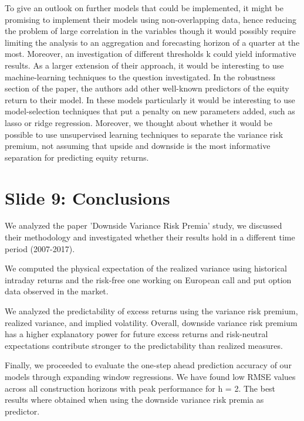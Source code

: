 \documentclass[12pt, letterpaper]{article}
\begin{document}
\vspace{3mm}
\noindent
To give an outlook on further models that could be implemented, it might be promising to implement their models using non-overlapping data, hence reducing the problem of large correlation in the variables though it would possibly require limiting the analysis to an aggregation and forecasting horizon of a quarter at the most. Moreover, an investigation of different thresholds k could yield informative results.
As a larger extension of their approach, it would be interesting to use machine-learning techniques to the question investigated. In the robustness section of the paper, the authors add other well-known predictors of the equity return to their model. In these models particularly it would be interesting to use model-selection techniques that put a penalty on new parameters added, such as lasso or ridge regression. Moreover, we thought about whether it would be possible to use unsupervised learning techniques to separate the variance risk premium, not assuming that upside and downside is the most informative separation for predicting equity returns.

\section{Slide 9: Conclusions}
We analyzed the paper ’Downside Variance Risk Premia’ study,  we discussed their methodology and investigated whether their results hold in a different time period (2007-2017). 

\vspace{3mm}
\noindent
We computed the physical expectation of the realized variance using historical intraday returns and the risk-free one working on European call and put option data observed in the market. 

\vspace{3mm}
\noindent
We analyzed the predictability of excess returns using the variance risk premium, realized variance, and implied volatility. Overall, downside variance risk premium has a higher explanatory power for future excess returns and risk-neutral expectations contribute stronger to the predictability than realized measures. 

\vspace{3mm}
\noindent
Finally, we proceeded to evaluate the one-step ahead prediction accuracy of our models through expanding window regressions. We have found low RMSE values across all construction horizons with peak performance for h = 2. The best results where obtained when using the downside variance risk premia as predictor.
\end{document}
